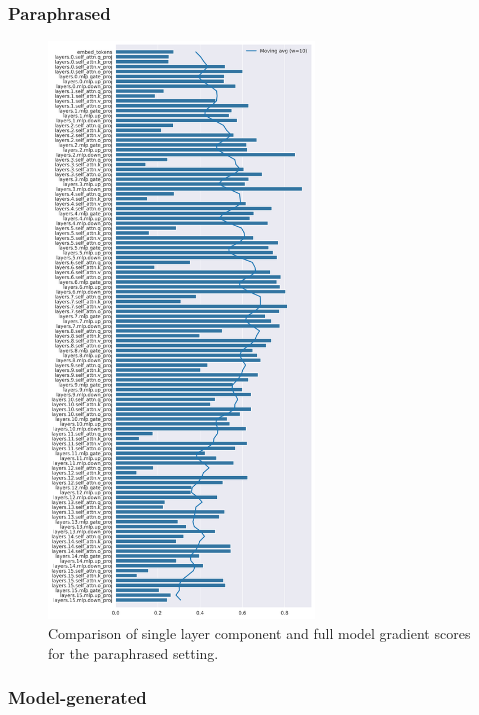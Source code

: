 \subsubsection{Paraphrased}
\begin{figure}[ht]
    \centering
    \includegraphics[width=0.63\textwidth]{figures/results/paraphrased/layer_comparison_full_gradient.png}
    \caption{Comparison of single layer component and full model gradient scores for the paraphrased setting.}
    \label{fig:paraphrased_layer_comparison_full_gradient}
\end{figure}

\subsubsection{Model-generated}

